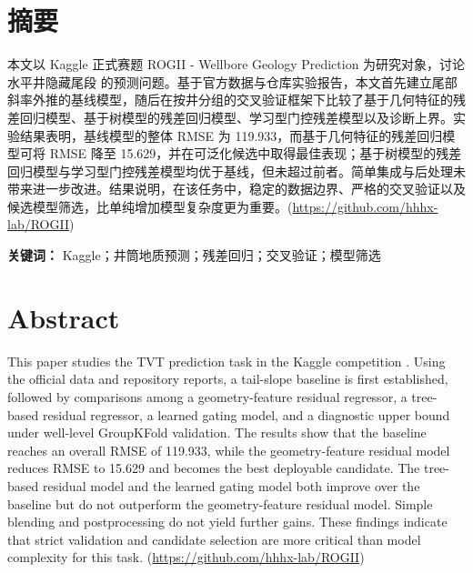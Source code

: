 \documentclass[openany]{Template_ECNU_Undergraduate_202505/ecnuundergraduate}
\newcommand{\cvtab}[1]{\path{#1}}
\begin{document}
\makecover
\clearpage

\chapter*{摘要}
\noindent 本文以 Kaggle 正式赛题 ROGII - Wellbore Geology Prediction 为研究对象，讨论水平井隐藏尾段 \cvtab{TVT} 的预测问题。基于官方数据与仓库实验报告，本文首先建立尾部斜率外推的基线模型，随后在按井分组的交叉验证框架下比较了基于几何特征的残差回归模型、基于树模型的残差回归模型、学习型门控残差模型以及诊断上界。实验结果表明，基线模型的整体 RMSE 为 119.933，而基于几何特征的残差回归模型可将 RMSE 降至 15.629，并在可泛化候选中取得最佳表现；基于树模型的残差回归模型与学习型门控残差模型均优于基线，但未超过前者。简单集成与后处理未带来进一步改进。结果说明，在该任务中，稳定的数据边界、严格的交叉验证以及候选模型筛选，比单纯增加模型复杂度更为重要。(\href{https://github.com/hhhx-lab/ROGII}{https://github.com/hhhx-lab/ROGII})

\noindent\textbf{关键词：} Kaggle；井筒地质预测；残差回归；交叉验证；模型筛选

\clearpage
\chapter*{Abstract}
\noindent This paper studies the TVT prediction task in the Kaggle competition \cvtab{ROGII - Wellbore Geology Prediction}. Using the official data and repository reports, a tail-slope baseline is first established, followed by comparisons among a geometry-feature residual regressor, a tree-based residual regressor, a learned gating model, and a diagnostic upper bound under well-level GroupKFold validation. The results show that the baseline reaches an overall RMSE of 119.933, while the geometry-feature residual model reduces RMSE to 15.629 and becomes the best deployable candidate. The tree-based residual model and the learned gating model both improve over the baseline but do not outperform the geometry-feature residual model. Simple blending and postprocessing do not yield further gains. These findings indicate that strict validation and candidate selection are more critical than model complexity for this task. (\href{https://github.com/hhhx-lab/ROGII}{https://github.com/hhhx-lab/ROGII})
\end{document}
